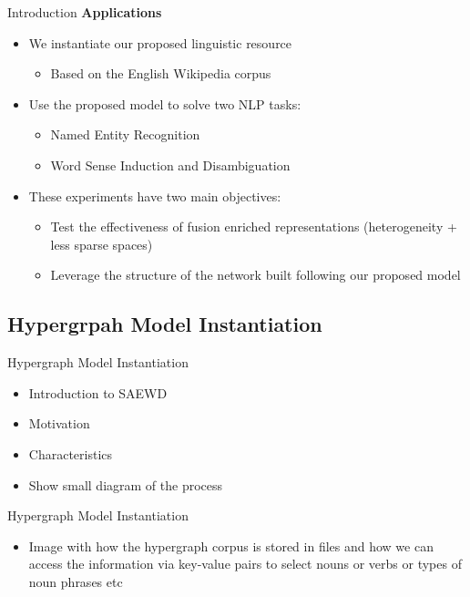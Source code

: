 \documentclass[10pt,xcolor=table]{beamer}
\begin{document}
\begin{frame}{Introduction}
\large \textbf{Applications}
\vspace{.5cm}
\begin{itemize}
\item We instantiate our proposed linguistic resource 
\begin{itemize}
\item Based on the English Wikipedia corpus
\end{itemize}
\item Use the proposed model  to solve two NLP tasks:
	\begin{itemize}
	\item Named Entity Recognition 
	\item Word Sense Induction and Disambiguation
	\end{itemize}
\vspace{.3cm}
\item These experiments have two main objectives:
	\begin{itemize}
	\item Test the effectiveness of fusion enriched representations (heterogeneity + less sparse spaces)
	\item Leverage the structure of the network built following our proposed model
	\end{itemize}

\end{itemize}
\vspace{\textheight}
\end{frame}

\subsection{Hypergrpah Model Instantiation}
\begin{frame}{Hypergraph Model Instantiation}
\begin{itemize}
\item Introduction to SAEWD
\item Motivation
\item Characteristics
\item Show small diagram of the process
\end{itemize}
\end{frame} 

\begin{frame}{Hypergraph Model Instantiation}
\begin{itemize}
\item Image with how the hypergraph corpus is stored in files and how we can access the information via key-value pairs to select nouns or verbs or types of noun phrases etc
\end{itemize}
 \vspace{\textheight}
\end{frame} 
\end{document}
